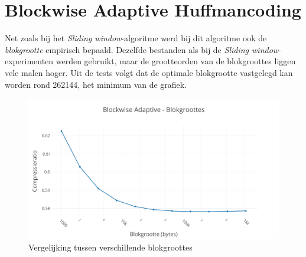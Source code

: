 \section{Blockwise Adaptive Huffmancoding}

Net zoals bij het \emph{Sliding window}-algoritme werd bij dit algoritme ook de \emph{blokgrootte} empirisch bepaald. Dezelfde bestanden als bij de \emph{Sliding window}-experimenten werden gebruikt, maar de grootteorden van de blokgroottes liggen vele malen hoger. Uit de tests volgt dat de optimale blokgrootte vastgelegd kan worden rond \SI{262144}{\byte}, het minimum van de grafiek.

\begin{figure}[h]
	\centering
	\includegraphics[width=0.9\linewidth]{resources/blockwise-size.png}
	\caption{Vergelijking tussen verschillende blokgroottes}
\end{figure}